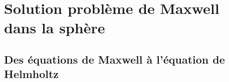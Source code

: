 \section{Solution problème de Maxwell dans la sphère}
\label{sec_sol_maxwell}





\subsection{Des équations de Maxwell à l'équation de Helmholtz}
% 
% 

